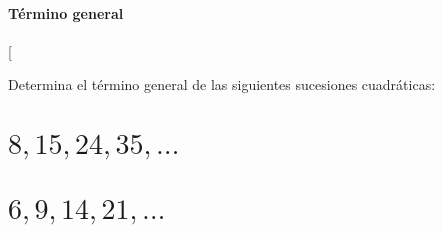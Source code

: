 \documentclass[12pt,addpoints]{repaso}
\begin{document}
\begin{questions}




    \subsection{Término general}

    \ejemplosboxed[{Determina el término general de las siguientes sucesiones cuadráticas:

                \begin{multicols}{2}
                    \begin{parts}
                        \part {\large $8,15,24,35,\dots$}

                        \begin{solutionbox}{2cm}
                            \fillin[$n^2+4n+3$][0cm]
                        \end{solutionbox}

                        \part {\large $6,9,14,21, \dots$}


\end{parts}
\end{multicols}}
\end{questions}
\end{document}
